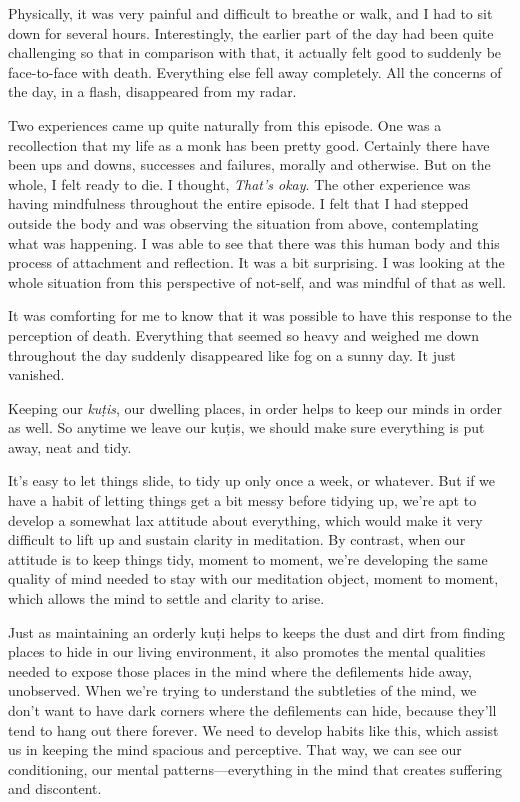 Physically, it was very painful and difficult to breathe or walk, and I 
had to sit down for several hours. Interestingly, the earlier part of 
the day had been quite challenging so that in comparison with that, it 
actually felt good to suddenly be face-to-face with death. Everything 
else fell away completely. All the concerns of the day, in a flash, 
disappeared from my radar.

Two experiences came up quite naturally from this episode. One was a 
recollection that my life as a monk has been pretty good. Certainly 
there have been ups and downs, successes and failures, morally and 
otherwise. But on the whole, I felt ready to die. I thought, 
\emph{That's okay}. The other experience was having mindfulness 
throughout the entire episode. I felt that I had stepped outside the 
body and was observing the situation from above, contemplating what was 
happening. I was able to see that there was this human body and this 
process of attachment and reflection. It was a bit surprising. I was 
looking at the whole situation from this perspective of not-self, and 
was mindful of that as well.

It was comforting for me to know that it was possible to have this 
response to the perception of death. Everything that seemed so heavy 
and weighed me down throughout the day suddenly disappeared like fog on 
a sunny day. It just vanished.


Keeping our \emph{kuṭis}, our dwelling places, in order helps to keep 
our minds in order as well. So anytime we leave our kuṭis, we should 
make sure everything is put away, neat and tidy.

It's easy to let things slide, to tidy up only once a week, or 
whatever. But if we have a habit of letting things get a bit messy 
before tidying up, we're apt to develop a somewhat lax attitude about 
everything, which would make it very difficult to lift up and sustain 
clarity in meditation. By contrast, when our attitude is to keep things 
tidy, moment to moment, we're developing the same quality of mind 
needed to stay with our meditation object, moment to moment, which 
allows the mind to settle and clarity to arise.

Just as maintaining an orderly kuṭi helps to keeps the dust and dirt 
from finding places to hide in our living environment, it also promotes 
the mental qualities needed to expose those places in the mind where 
the defilements hide away, unobserved. When we're trying to understand 
the subtleties of the mind, we don't want to have dark corners where 
the defilements can hide, because they'll tend to hang out there 
forever. We need to develop habits like this, which assist us in 
keeping the mind spacious and perceptive. That way, we can see our 
conditioning, our mental patterns---everything in the mind that creates 
suffering and discontent.


